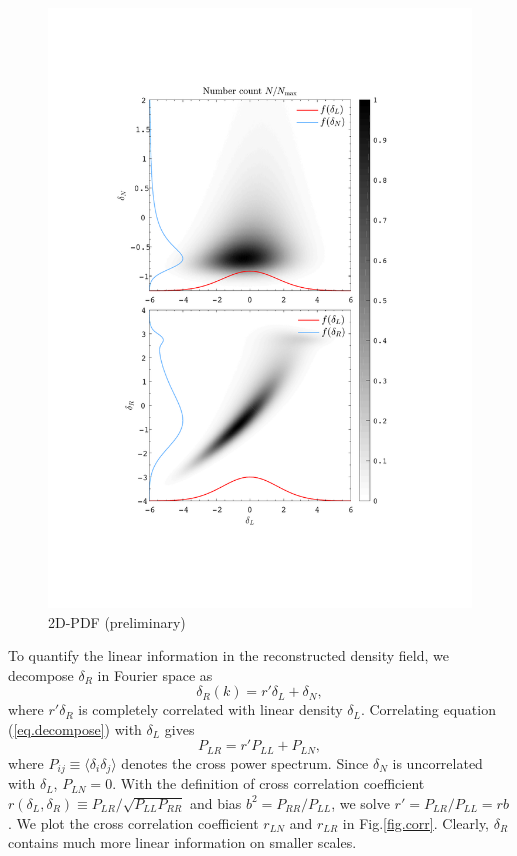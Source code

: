 \documentclass[aps,prd,twocolumn,superscriptaddress,amsfont,amssymb,amsmath,nofootinbib,showpacs,balancelastpage]{revtex4-1}
\begin{document}
\begin{figure}[t] \centering
  \includegraphics[width=1.0\linewidth]{pdfs.pdf}
  \caption{2D-PDF (preliminary)}
  \label{fig.pdfs}
\end{figure}

To quantify the linear information in the reconstructed density field, we decompose $\delta_R$ in Fourier space as
\begin{equation}\label{eq.decompose}
    \delta_R(k)=r'\delta_L+\delta_N,
\end{equation}
where $r'\delta_R$ is completely correlated with linear density $\delta_L$. Correlating equation (\ref{eq.decompose}) with $\delta_L$ gives
\begin{equation}
    P_{LR}=r'P_{LL}+P_{LN},
\end{equation}
where $P_{ij}\equiv\langle\delta_i\delta_j\rangle$ denotes the cross power 
spectrum. Since $\delta_N$ is uncorrelated with $\delta_L$, $P_{LN}=0$. With the 
definition of cross correlation coefficient $r(\delta_L,\delta_R)\equiv P_{LR}/\sqrt{P_{LL}P_{RR}}$ 
and bias $b^2=P_{RR}/P_{LL}$, we solve $r'=P_{LR}/P_{LL}=rb$. We plot the cross 
correlation coefficient $r_{LN}$ and $r_{LR}$ in Fig.\ref{fig.corr}. Clearly, $
\delta_R$ contains much more linear information on smaller scales.
\end{document}
